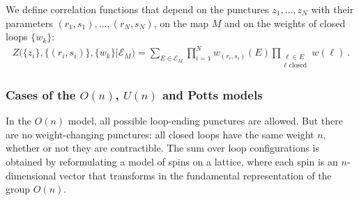 \documentclass[12pt, a4paper]{article}
\theoremstyle{break}
\begin{document}
We define correlation functions that depend on the punctures $z_1,\dots,z_N$ with their parameters $(r_1,s_1),\dots, (r_N,s_N)$, on the map $M$ and on the weights of closed loops $\{w_k\}$:
\begin{align}
 Z\Big(\{z_i\},\{(r_i,s_i)\},\{w_k\}\Big|\mathcal{E}_M\Big) =\sum_{E\in\mathcal{E}_M} \prod_{i=1}^N w_{(r_i,s_i)}(E) \prod_{\substack{\ell\in E\\ \ell \text{ closed}}} w(\ell) \ .
 \label{zbig}
\end{align}

\subsubsection{Cases of the $O(n)$, $U(n)$ and Potts models}\label{sec:coup}

In the $O(n)$ model, all possible loop-ending punctures are allowed. But there are no weight-changing punctures: all closed loops have the same weight $n$, whether or not they are contractible. The sum over loop configurations is obtained by reformulating a model of spins on a lattice, where each spin is an $n$-dimensional vector that transforms in the fundamental representation of the group $O(n)$. 
\end{document}
